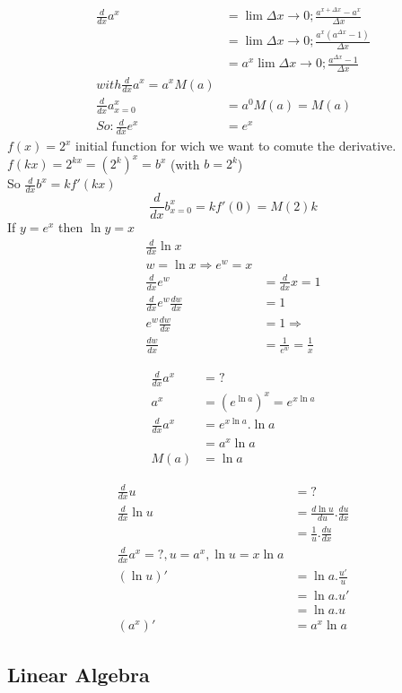 \documentclass{article}
\begin{document}
            \begin{align*}
                \frac{d}{dx} a^x &= \lim {\Delta x \to 0} ; \frac{a^{x+\Delta x} - a^x}{\Delta x}\\
                &= \lim {\Delta x \to 0} ; \frac{a^x (a^{\Delta x} -1)}{\Delta x}\\
                &= a^x \lim {\Delta x \to 0} ; \frac{a^{\Delta x} -1}{\Delta x}\\
                with \frac{d}{dx} a^x = a^x M(a)\\
                \frac{d}{dx}a^x_{x=0} &= a^0 M(a) = M(a)\\
                So :
                \frac{d}{dx} e^x &= e^x
            \end{align*}
            $f(x) = 2^x$ initial function for wich we want to comute the derivative.\\
            $f(kx) = 2^{kx} = (2^k)^x = b^x$ (with $b=2^k$)\\
            So $\frac{d}{dx}b^x = kf'(kx)$
            \[ \frac{d}{dx}b^x_{x=0} = kf'(0) = M(2)k \]
            If $y=e^x$ then $\ln y = x$\\

            \begin{align*}
                \frac{d}{dx} \ln x\\
                w = \ln x \Rightarrow e^w = x\\
                \frac{d}{dx} e^w &= \frac{d}{dx} x = 1\\
                \frac{d}{dx} e^w \frac{dw}{dx} &= 1\\
                e^w \frac{dw}{dx} &= 1 \Rightarrow \\
                \frac{dw}{dx} &= \frac{1}{e^w} = \frac{1}{x}
            \end{align*}

            \begin{align*}
                \frac{d}{dx} a^x &= ?\\
                a^x &= (e^{\ln a})^x = e^{x\ln a}\\
                \frac{d}{dx} a^x &= e^{x\ln a} . \ln a\\
                &= a^x \ln a\\
                M(a) &= \ln a
            \end{align*}

            \begin{align*}
                \frac{d}{dx} u &= ?\\
                \frac{d}{dx} \ln u &= \frac{d \ln u}{du} . \frac{du}{dx} \\
                &= \frac{1}{u}.\frac{du}{dx}\\
                \frac{d}{dx} a^x = ? , u = a^x , \ln u = x\ln a \\
                (\ln u)' &= \ln a. \frac{u'}{u}\\
                &= \ln a . u'\\
                &= \ln a .u \\
                (a^x)' &= a^x \ln a
            \end{align*}


        \subsection{Linear Algebra}
\end{document}
